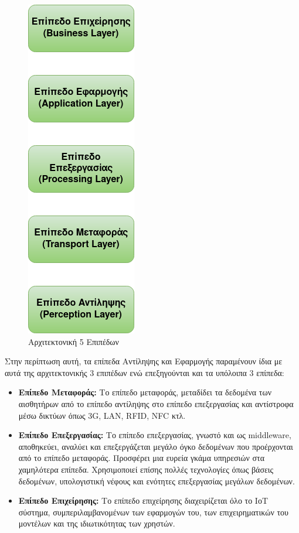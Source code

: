 \begin{figure}[h]
    \centering
    \includegraphics[scale=0.7]{images/chapter2/IoT_5tier.png}
    \caption{Αρχιτεκτονική 5 Επιπέδων}
    \label{fig:iot_5_tier}
\end{figure}

Στην περίπτωση αυτή, τα επίπεδα Αντίληψης και Εφαρμογής παραμένουν ίδια με αυτά της αρχιτεκτονικής 3 επιπέδων ενώ επεξηγούνται και τα υπόλοιπα 3 επίπεδα:
\begin{itemize}
    \item \textbf{Επίπεδο Μεταφοράς:} Το επίπεδο μεταφοράς, μεταδίδει τα δεδομένα των αισθητήρων από το επίπεδο αντίληψης στο επίπεδο επεξεργασίας και αντίστροφα μέσω δικτύων όπως 3G, LAN, RFID, NFC κτλ.
    \item \textbf{Επίπεδο Επεξεργασίας:} Το επίπεδο επεξεργασίας, γνωστό και ως middleware, αποθηκεύει, αναλύει και επεξεργάζεται μεγάλο όγκο δεδομένων που προέρχονται από το επίπεδο μεταφοράς. Προσφέρει μια ευρεία γκάμα υπηρεσιών στα χαμηλότερα επίπεδα. Χρησιμοποιεί επίσης πολλές τεχνολογίες όπως βάσεις δεδομένων, υπολογιστική νέφους και ενότητες επεξεργασίας μεγάλων δεδομένων.
    \item \textbf{Επίπεδο Επιχείρησης:} Το επίπεδο επιχείρησης διαχειρίζεται όλο το ΙοΤ σύστημα, συμπεριλαμβανομένων των εφαρμογών του, των επιχειρηματικών του μοντέλων και της ιδιωτικότητας των χρηστών.
\end{itemize}